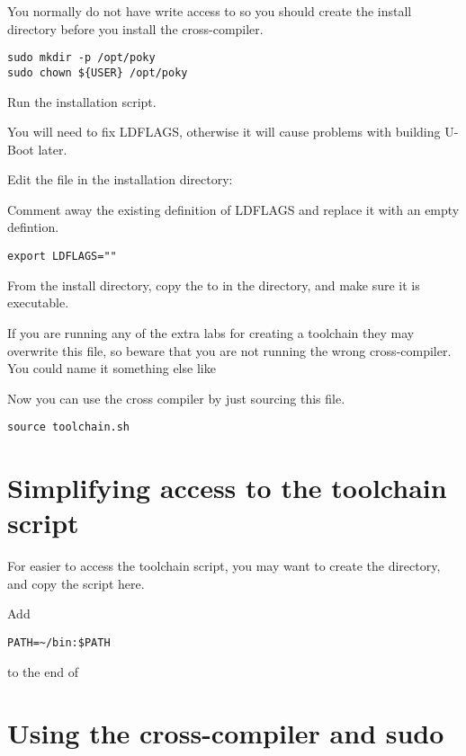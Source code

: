 You normally do not have write access to  so you should
create the install directory before you install the cross-compiler.

\begin{verbatim}
sudo mkdir -p /opt/poky
sudo chown ${USER} /opt/poky
\end{verbatim}

Run the installation script.

You will need to fix LDFLAGS, otherwise it will cause problems with building U-Boot later.

Edit the  file in the installation directory:

Comment away the existing definition of LDFLAGS and replace it with an empty defintion.

\begin{verbatim}
export LDFLAGS=""
\end{verbatim}

From the install directory, copy the  to  in the \labdir directory, and make sure it is executable.

If you are running any of the extra labs for creating a toolchain
they may overwrite this file, so beware that you are not running
the wrong cross-compiler. You could name it something else like

Now you can use the cross compiler by just sourcing this file.

\begin{verbatim}
source toolchain.sh
\end{verbatim}

\section{Simplifying access to the toolchain script}

For easier to access the toolchain script,
you may want to create the  directory,
and copy the script here.

Add 

\begin{verbatim}
PATH=~/bin:$PATH
\end{verbatim}

to the end of 

\section{Using the cross-compiler and sudo}

